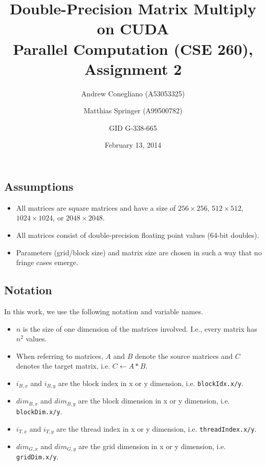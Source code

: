\documentclass[12pt]{article}
\begin{document}
\title{Double-Precision Matrix Multiply on CUDA  \\ \vspace{2 mm} {\large Parallel Computation (CSE 260), Assignment 2}}
\date{February 13, 2014}
\author{Andrew Conegliano (A53053325) \and Matthias Springer (A99500782) \and GID G-338-665}
\maketitle

\subsection*{Assumptions}
\begin{itemize}
        \item All matrices are square matrices and have a size of $256 \times 256$, $512 \times 512$, $1024 \times 1024$, or $2048 \times 2048$.
        \item All matrices consist of double-precision floating point values (64-bit doubles).
        \item Parameters (grid/block size) and matrix size are chosen in such a way that no fringe cases emerge.
\end{itemize}

\subsection*{Notation}
In this work, we use the following notation and variable names.
\begin{itemize}
        \item $n$ is the size of one dimension of the matrices involved. I.e., every matrix has $n^2$ values.
        \item When referring to matrices, $A$ and $B$ denote the source matrices and $C$ denotes the target matrix, i.e. $C \leftarrow A * B$.
        \item $i_{B,x}$ and $i_{B,y}$ are the block index in x or y dimension, i.e. \lstinline{blockIdx.x/y}.
        \item $\mathit{dim}_{B,x}$ and $\mathit{dim}_{B,y}$ are the block dimension in x or y dimension, i.e. \lstinline{blockDim.x/y}.
        \item $i_{T,x}$ and $i_{T,y}$ are the thread index in x or y dimension, i.e. \lstinline{threadIndex.x/y}.
        \item $\mathit{dim}_{G,x}$ and $\mathit{dim}_{G,y}$ are the grid dimension in x or y dimension, i.e. \lstinline{gridDim.x/y}.
\end{itemize}
\end{document}
